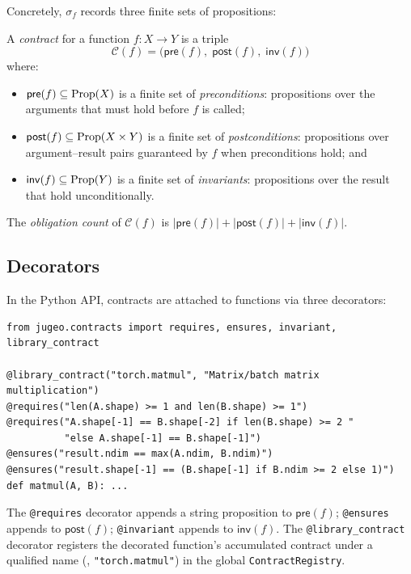 \documentclass[11pt]{article}
\newcommand{\ContractOf}[1]{\mathcal{C}(#1)}  %
\newcommand{\Pre}{\mathsf{pre}}            %
\newcommand{\Post}{\mathsf{post}}          %
\newcommand{\Inv}{\mathsf{inv}}            %
\begin{document}
Concretely, $\sigma_f$ records three finite sets of propositions:

\begin{definition}[Contract]\label{def:contract}
A \emph{contract} for a function $f\colon X \to Y$ is a triple
\[
  \ContractOf{f} = \bigl(\Pre(f),\; \Post(f),\; \Inv(f)\bigr)
\]
where:
\begin{itemize}
  \item $\Pre(f) \subseteq \textup{Prop}(X)$ is a finite set of
    \emph{preconditions}: propositions over the arguments that must hold
    before $f$ is called;
  \item $\Post(f) \subseteq \textup{Prop}(X \times Y)$ is a finite set
    of \emph{postconditions}: propositions over argument–result pairs
    guaranteed by $f$ when preconditions hold; and
  \item $\Inv(f) \subseteq \textup{Prop}(Y)$ is a finite set of
    \emph{invariants}: propositions over the result that hold
    unconditionally.
\end{itemize}
The \emph{obligation count} of $\ContractOf{f}$ is
$|\Pre(f)| + |\Post(f)| + |\Inv(f)|$.
\end{definition}

\subsection{Decorators}

In the \JuGeo{} Python API, contracts are attached to functions via
three decorators:

\begin{lstlisting}[style=jugeo-python, caption={Contract decorator API.}]
from jugeo.contracts import requires, ensures, invariant, library_contract

@library_contract("torch.matmul", "Matrix/batch matrix multiplication")
@requires("len(A.shape) >= 1 and len(B.shape) >= 1")
@requires("A.shape[-1] == B.shape[-2] if len(B.shape) >= 2 "
          "else A.shape[-1] == B.shape[-1]")
@ensures("result.ndim == max(A.ndim, B.ndim)")
@ensures("result.shape[-1] == (B.shape[-1] if B.ndim >= 2 else 1)")
def matmul(A, B): ...
\end{lstlisting}

The \texttt{@requires} decorator appends a string proposition to
$\Pre(f)$; \texttt{@ensures} appends to $\Post(f)$; \texttt{@invariant}
appends to $\Inv(f)$.  The \texttt{@library\_contract} decorator
registers the decorated function's accumulated contract under a
qualified name (\eg, \texttt{"torch.matmul"}) in the global
\texttt{ContractRegistry}.
\end{document}
